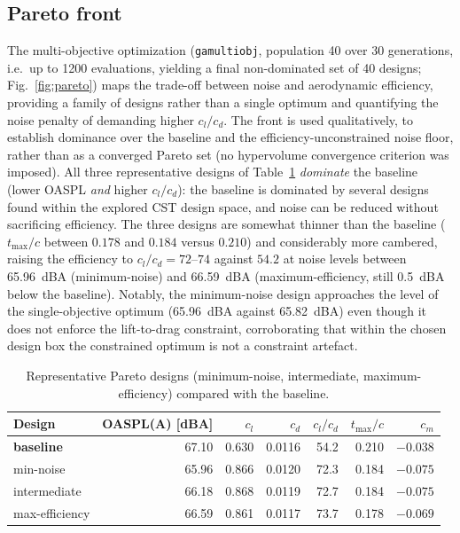 \documentclass[preprint,3p,times]{elsarticle}
\begin{document}
\subsection{Pareto front}\label{sec:pareto}
The multi-objective optimization (\texttt{gamultiobj}, population 40 over 30
generations, i.e.\ up to 1200 evaluations, yielding a final non-dominated set
of 40 designs; Fig.~\ref{fig:pareto}) maps the trade-off
between noise and aerodynamic efficiency, providing a family of designs rather
than a single optimum and quantifying the noise penalty of demanding higher
$c_l/c_d$. The front is used qualitatively, to establish dominance over the
baseline and the efficiency-unconstrained noise floor, rather than as a
converged Pareto set (no hypervolume convergence criterion was imposed). All three representative designs of Table~\ref{tab:pareto}
\emph{dominate} the baseline (lower OASPL \emph{and} higher $c_l/c_d$): the
baseline is dominated by several designs found within the explored CST design
space, and noise can be reduced without sacrificing
efficiency. The three designs are somewhat thinner than the baseline
($t_{\max}/c$ between $0.178$ and $0.184$ versus $0.210$) and considerably more
cambered, raising the efficiency to $c_l/c_d=72$--$74$ against $54.2$ at noise
levels between \SI{65.96}{dBA} (minimum-noise) and \SI{66.59}{dBA}
(maximum-efficiency, still \SI{0.5}{dBA} below the baseline). Notably, the
minimum-noise design approaches the level of the single-objective optimum
(\SI{65.96}{dBA} against \SI{65.82}{dBA}) even though it does not enforce the
lift-to-drag constraint, corroborating that within the chosen design box the
constrained optimum is not a constraint artefact.

\begin{table}[!htbp]\centering
\caption{Representative Pareto designs (minimum-noise, intermediate,
maximum-efficiency) compared with the baseline.}
\label{tab:pareto}
\begin{tabular}{@{}lrrrrrr@{}}
\toprule
Design & OASPL(A) [dBA] & $c_l$ & $c_d$ & $c_l/c_d$ & $t_{\max}/c$ & $c_m$ \\
\midrule
\textbf{baseline} & 67.10 & 0.630 & 0.0116 & 54.2 & 0.210 & $-0.038$ \\
min-noise         & 65.96 & 0.866 & 0.0120 & 72.3 & 0.184 & $-0.075$ \\
intermediate      & 66.18 & 0.868 & 0.0119 & 72.7 & 0.184 & $-0.075$ \\
max-efficiency    & 66.59 & 0.861 & 0.0117 & 73.7 & 0.178 & $-0.069$ \\
\bottomrule
\end{tabular}
\end{table}
\end{document}

